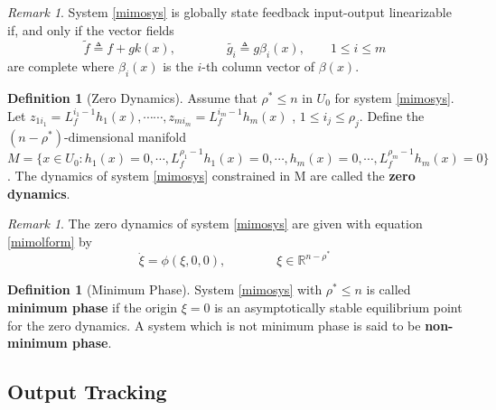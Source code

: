 \documentclass[11pt, a4paper, oneside, openany, reqno]{book}
\theoremstyle{definition}
\newtheorem{definition}[theorem]{Definition}
\theoremstyle{remark}
\newtheorem{remark}[theorem]{Remark}
\numberwithin{equation}{chapter} %
\newcommand{\R}{\ensuremath{{\mathbb R}}}
\begin{document}
\begin{remark} 
	System \eqref{mimosys} is globally state feedback input-output linearizable 
	if, and only if the vector fields
	\begin{equation} \label{mimovfield}
	\tilde{f} \triangleq f+gk(x),
	\qquad\qquad \tilde{g_i} \triangleq g\beta_i (x),
	\qquad 1 \leq i \leq m
	\end{equation}
	are complete where $ \beta_i(x) $ is the $ i $-th column vector of  $\beta (x)$.
\end{remark}

\begin{definition}[Zero Dynamics]
	Assume that $\rho^* \leq n$ in $ U_0  $ for system \eqref{mimosys}.\\
	Let $ z_{1i_1}=L_f^{i_1-1}h_1(x), \cdots\cdots, z_{mi_m}=L_f^{i_m-1}h_m(x) $ ,
	$ 1 \leq i_j \leq \rho_j $. 
	Define the $ (n-\rho^*) $-dimensional manifold 
	$ M=\lbrace x \in U_0 : h_1(x) =0,\cdots,L_f^{\rho_1-1} h_1(x)=0,\cdots,
	h_m(x) =0,\cdots,L_f^{\rho_m-1} h_m(x)=0 \rbrace $.
	The dynamics of system \eqref{mimosys} constrained in M are called the \textbf{zero dynamics}.
\end{definition}

\begin{remark}
	The zero dynamics of system \eqref{mimosys} are given with equation \eqref{mimolform} by 
	\begin{equation}
	\dot{\xi} = \phi(\xi,0,0), \qquad\qquad \xi \in \R^{n-\rho^*}
	\end{equation}
\end{remark}

\begin{definition}[Minimum Phase]
	System \eqref{mimosys} with $ \rho^* \leq n $ is called \textbf{minimum phase} 
	if the origin $ \xi=0 $	is an asymptotically stable equilibrium point for the zero dynamics. 
	A system which is not minimum phase is said to be \textbf{non-minimum phase}.
\end{definition}

\subsection{Output Tracking}
\end{document}
